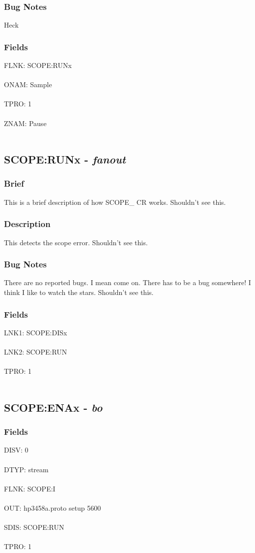 \documentclass[12pt]{article}
\begin{document}
\subsubsection{Bug Notes}
Heck 

\subsubsection{Fields}
FLNK: SCOPE:RUNx\\\\ ONAM: Sample\\\\ TPRO: 1\\\\ ZNAM: Pause\\\\ \newpage
\subsection{SCOPE:RUNx - \textit{fanout}}
\subsubsection{Brief}
This is a brief description of how SCOPE\_ CR works. Shouldn't see this. \\
\subsubsection{Description}
This detects the scope error. Shouldn't see this.
\subsubsection{Bug Notes}
There are no reported bugs. I mean come on. There has to be a bug somewhere! I think I like to watch the stars. Shouldn't see this. 

\subsubsection{Fields}
LNK1: SCOPE:DISx\\\\ LNK2: SCOPE:RUN\\\\ TPRO: 1\\\\ \newpage
\subsection{SCOPE:ENAx - \textit{bo}}
\subsubsection{Fields}
DISV: 0\\\\ DTYP: stream\\\\ FLNK: SCOPE:I\\\\ OUT: hp3458a.proto setup 5600\\\\ SDIS: SCOPE:RUN\\\\ TPRO: 1\\\\ \newpage
\end{document}
